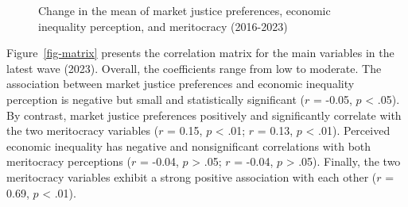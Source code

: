 \documentclass[
  12pt,
]{article}
\begin{document}
\begin{figure}[H]

\caption{\label{fig-meanchange}Change in the mean of market justice
preferences, economic inequality perception, and meritocracy
(2016-2023)}


\end{figure}%

Figure~\ref{fig-matrix} presents the correlation matrix for the main
variables in the latest wave (2023). Overall, the coefficients range
from low to moderate. The association between market justice preferences
and economic inequality perception is negative but small and
statistically significant (\(r\) = -0.05, \(p\) \textless{} .05). By
contrast, market justice preferences positively and significantly
correlate with the two meritocracy variables (\(r\) = 0.15, \(p\)
\textless{} .01; \(r\) = 0.13, \(p\) \textless{} .01). Perceived
economic inequality has negative and nonsignificant correlations with
both meritocracy perceptions (\(r\) = -0.04, \(p\) \textgreater{} .05;
\(r\) = -0.04, \(p\) \textgreater{} .05). Finally, the two meritocracy
variables exhibit a strong positive association with each other (\(r\) =
0.69, \(p\) \textless{} .01).
\end{document}
